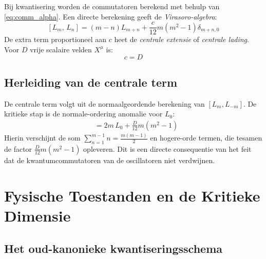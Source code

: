\documentclass[12pt,a4paper]{article}
\begin{document}
            Bij kwantisering worden de commutatoren berekend met behulp van \eqref{eq:comm_alpha}. Een directe berekening geeft de \emph{Virasoro-algebra}:
            \begin{equation}
                \boxed{[L_m,\,L_n] = (m-n)L_{m+n} + \frac{c}{12}m(m^2-1)\delta_{m+n,0}}
                \label{eq:Virasoro_algebra}
            \end{equation}
            De extra term proportioneel aan $c$ heet de \emph{centrale extensie} of \emph{centrale lading}. Voor $D$ vrije scalaire velden $X^\mu$ is:
            \begin{equation}
                c = D
            \end{equation}

        \subsection{Herleiding van de centrale term}

            De centrale term volgt uit de normaalgeordende berekening van $[L_m, L_{-m}]$. De kritieke stap is de normale-ordering anomalie voor $L_0$:
            \begin{align}
            [L_m,L_{-m}] &= 2m\,L_0 + \frac{D}{12}m(m^2-1)
            \end{align}
            Hierin verschijnt de som $\sum_{n=1}^{m-1}n = \frac{m(m-1)}{2}$ en hogere-orde termen, die tesamen de factor $\frac{D}{12}m(m^2-1)$ opleveren. Dit is een directe consequentie van het feit dat de kwantumcommutatoren van de oscillatoren niet verdwijnen.

    \section{Fysische Toestanden en de Kritieke Dimensie}

        \subsection{Het oud-kanonieke kwantiseringsschema}
\end{document}
